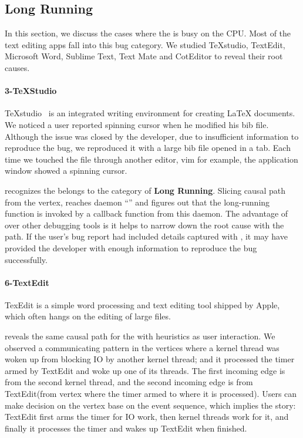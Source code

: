 \subsection{Long Running}

In this section, we discuss the cases where the \spinningnode is busy on the
CPU. Most of the text editing apps fall into this bug category. We studied
TeXstudio, TextEdit, Microsoft Word, Sublime Text, Text Mate and CotEditor to
reveal their root causes.


\paragraph{3-TeXStudio}

TeXstudio~\cite{TeXStudio} is an integrated writing environment for creating
LaTeX documents. We noticed a user reported spinning cursor when he
modified his bib file. Although the issue was closed by the developer, due to
insufficient information to reproduce the bug, we reproduced it with a large bib
file opened in a tab. Each time we touched the file through another editor, vim
for example, the application window showed a spinning cursor.

\xxx recognizes the \spinningnode belongs to the category of \textbf{Long
Running}. Slicing causal path from the vertex, \xxx reaches daemon
``'' and figures out that the long-running function is invoked by a callback
function from this daemon. The advantage of \xxx over other debugging tools is
it helps to narrow down the root cause with the path. If the user's bug report
had included details captured with \xxx, it may have provided the developer with
enough information to reproduce the bug successfully.

\paragraph{6-TextEdit}

TexEdit is a simple word processing and text editing tool shipped by Apple, which
often hangs on the editing of large files. 

\xxx reveals the same causal path for the \spinningnode with heuristics as user
interaction. We observed a communicating pattern in the vertices where a kernel
thread was woken up from blocking IO by another kernel thread; and it processed
the timer armed by TextEdit and woke up one of its threads. The first incoming
edge is from the second kernel thread, and the second incoming edge is from
TextEdit(from vertex where the timer armed to where it is processed). Users can
make decision on the vertex base on the event sequence, which implies the story:
TextEdit first arms the timer for IO work, then kernel threads work for it, and
finally it processes the timer and wakes up TextEdit when finished.

